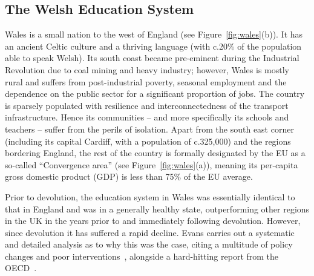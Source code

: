 \subsection{The Welsh Education System}

Wales is a small nation to the west of England (see
Figure~\ref{fig:wales}(b)).  It has an ancient Celtic culture and a
thriving language (with c.20\% of the population able to speak Welsh).
Its south coast became pre-eminent during the Industrial Revolution
due to coal mining and heavy industry; however, Wales is mostly rural
and suffers from post-industrial poverty, seasonal employment and the
dependence on the public sector for a significant proportion of
jobs. The country is sparsely populated with resilience and
interconnectedness of the transport infrastructure.  Hence its
communities -- and more specifically its schools and teachers --
suffer from the perils of isolation. Apart from the south east corner
(including its capital Cardiff, with a population of c.325,000) and
the regions bordering England, the rest of the country is formally
designated by the EU as a so-called ``Convergence area'' (see
Figure~\ref{fig:wales}(a)), meaning its per-capita gross domestic
product (GDP) is less than 75\% of the EU average.

Prior to devolution, the education system in Wales was essentially
identical to that in England and was in a generally healthy state,
outperforming other regions in the UK in the years prior to and
immediately following devolution.  However, since devolution it has
suffered a rapid decline.  Evans carries out a systematic and detailed
analysis as to why this was the case, citing a multitude of policy
changes and poor interventions~\cite{Evans:2015}, alongside a
hard-hitting report from the OECD~\cite{oecdwales:2014}.

